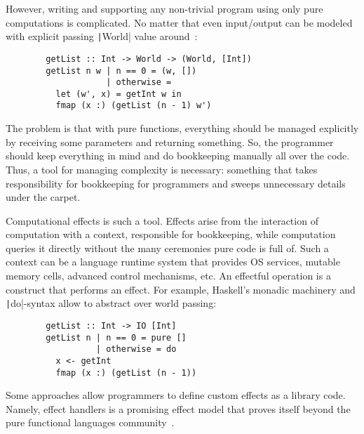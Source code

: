 \documentclass[conference]{IEEEtran}
\begin{document}
    However, writing and supporting any non-trivial program using only pure computations is complicated.
    No matter that even input/output can be modeled with explicit passing \texttt|World| value around~\cite{peyton1993imperative}:

    \begin{verbatim}
        getList :: Int -> World -> (World, [Int])
        getList n w | n == 0 = (w, [])
                    | otherwise =
          let (w', x) = getInt w in
          fmap (x :) (getList (n - 1) w')
    \end{verbatim}

    The problem is that with pure functions, everything should be managed explicitly by receiving some parameters and returning something.
    So, the programmer should keep everything in mind and do bookkeeping manually all over the code.
    Thus, a tool for managing complexity is necessary: something that takes responsibility for bookkeeping for programmers and sweeps unnecessary details under the carpet.

    Computational effects is such a tool.
    Effects arise from the interaction of computation with a context, responsible for bookkeeping, while computation queries it directly without the many ceremonies pure code is full of.
    Such a context can be a language runtime system that provides OS services, mutable memory cells, advanced control mechanisms, etc.
    An effectful operation is a construct that performs an effect.
    For example, Haskell's monadic machinery and \texttt|do|-syntax allow to abstract over world passing:

    \begin{verbatim}
        getList :: Int -> IO [Int]
        getList n | n == 0 = pure []
                  | otherwise = do
          x <- getInt
          fmap (x :) (getList (n - 1))
    \end{verbatim}

    Some approaches allow programmers to define custom effects as a library code.
    Namely, effect handlers is a promising effect model that proves itself beyond the pure functional languages community~\cite{plotkin2013handling, chandrasekaran2018algebraic}.

%
\end{document}
